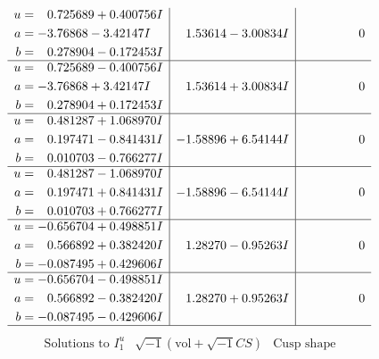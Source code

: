 \documentclass[1p]{elsarticle_modified}
\theoremstyle{definition}
\newcommand{\I}{\sqrt{-1}}
\begin{document}
$$\begin{array}{c|c|c}
\begin{aligned}
u &= \phantom{-}0.725689 + 0.400756 I \\
a &= -3.76868 - 3.42147 I \\
b &= \phantom{-}0.278904 - 0.172453 I\end{aligned}
 & \phantom{-}1.53614 - 3.00834 I & \phantom{-0.000000 } 0 \\ \hline\begin{aligned}
u &= \phantom{-}0.725689 - 0.400756 I \\
a &= -3.76868 + 3.42147 I \\
b &= \phantom{-}0.278904 + 0.172453 I\end{aligned}
 & \phantom{-}1.53614 + 3.00834 I & \phantom{-0.000000 } 0 \\ \hline\begin{aligned}
u &= \phantom{-}0.481287 + 1.068970 I \\
a &= \phantom{-}0.197471 - 0.841431 I \\
b &= \phantom{-}0.010703 - 0.766277 I\end{aligned}
 & -1.58896 + 6.54144 I & \phantom{-0.000000 } 0 \\ \hline\begin{aligned}
u &= \phantom{-}0.481287 - 1.068970 I \\
a &= \phantom{-}0.197471 + 0.841431 I \\
b &= \phantom{-}0.010703 + 0.766277 I\end{aligned}
 & -1.58896 - 6.54144 I & \phantom{-0.000000 } 0 \\ \hline\begin{aligned}
u &= -0.656704 + 0.498851 I \\
a &= \phantom{-}0.566892 + 0.382420 I \\
b &= -0.087495 + 0.429606 I\end{aligned}
 & \phantom{-}1.28270 - 0.95263 I & \phantom{-0.000000 } 0 \\ \hline\begin{aligned}
u &= -0.656704 - 0.498851 I \\
a &= \phantom{-}0.566892 - 0.382420 I \\
b &= -0.087495 - 0.429606 I\end{aligned}
 & \phantom{-}1.28270 + 0.95263 I & \phantom{-0.000000 } 0\\
 \hline 
 \end{array}$$\newpage$$\begin{array}{c|c|c}  
\text{Solutions to }I^u_{1}& \I (\text{vol} + \sqrt{-1}CS) & \text{Cusp shape}\\

\end{array}$$
\end{document}
